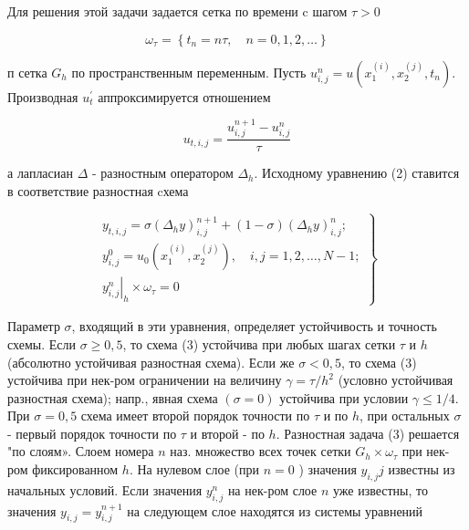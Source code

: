 \documentclass[10pt]{article}
\begin{document}
Для решения этой задачи задается сетка по времени c шагом $\tau>0$



\[

\omega_{\tau}=\left\{t_{n}=n \tau, \quad n=0,1,2, \ldots\right\}

\]



п сетка $G_{h}$ по пространственным переменным. Пусть $u_{i, j}^{n}=u\left(x_{1}^{(i)}, x_{2}^{(j)}, t_{n}\right)$. Производная $u_{t}^{\prime}$ аппроксимируется отношением



\[

u_{t, i, j}=\frac{u_{i, j}^{n+1}-u_{i, j}^{n}}{\tau}

\]



а лапласиан $\Delta$ - разностным оператором $\Delta_{h}$. Исходному уравнению (2) ставится в соответствие разностная cхема



\[

\left.\begin{array}{l}

y_{t, i, j}=\sigma\left(\Delta_{h} y\right)_{i, j}^{n+1}+(1-\sigma)\left(\Delta_{h} y\right)_{i, j}^{n} ; \\

y_{i, j}^{0}=u_{0}\left(x_{1}^{(i)}, x_{2}^{(j)}\right), \quad i, j=1,2, \ldots, N-1 ; \\

\left.y_{i, j}^{n}\right|_{h} \times \omega_{\tau}=0

\end{array}\right\}

\]



Параметр $\sigma$, входящий в эти уравнения, определяет устойчивость и точность схемы. Если $\sigma \geqslant 0,5$, то схема (3) устойчива при любых шагах сетки $\tau$ и $h$ (абсолютно устойчивая разностная схема). Если же $\sigma<0,5$, то схема (3) устойчива при нек-ром ограничении на величину $\gamma=\tau / h^{2}$ (условно устойчивая разностная схема); напр., явная схема $(\sigma=0)$ устойчива при условии $\gamma \leqslant 1 / 4$. При $\sigma=0,5$ схема имеет второй порядок точности по $\tau$ и по $h$, при остальных $\sigma$ - первый порядок точности по $\tau$ и второй - по $h$. Разностная задача (3) решается "по слоям». Слоем номера $n$ наз. множество всех точек сетки $G_{h} \times \omega_{\tau}$ при нек-ром фиксированном $h$. На нулевом слое (при $n=0$ ) значения $y_{i, j} j$ известны из начальных условий. Если значения $y_{i, j}^{n}$ на нек-ром слое $n$ уже известны, то значения $y_{i, j}=y_{i, j}^{n+1}$ на следующем слое находятся из системы уравнений
\end{document}
